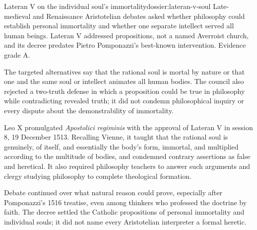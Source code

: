 \begin{heresydossier}{Lateran V on the individual soul's immortality}{dossier:lateran-v-soul}
\objectfield Late-medieval and Renaissance Aristotelian debates asked whether philosophy could establish personal immortality and whether one separate intellect served all human beings. Lateran V addressed propositions, not a named Averroist church, and its decree predates Pietro Pomponazzi's best-known intervention. Evidence grade A.

\propositionfield The targeted alternatives say that the rational soul is mortal by nature or that one and the same soul or intellect animates all human bodies. The council also rejected a two-truth defense in which a proposition could be true in philosophy while contradicting revealed truth; it did not condemn philosophical inquiry or every dispute about the demonstrability of immortality.

\responsefield Leo X promulgated \emph{Apostolici regiminis} with the approval of Lateran V in session 8, 19 December 1513. Recalling Vienne, it taught that the rational soul is genuinely, of itself, and essentially the body's form, immortal, and multiplied according to the multitude of bodies, and condemned contrary assertions as false and heretical. It also required philosophy teachers to answer such arguments and clergy studying philosophy to complete theological formation.

\aftermathfield Debate continued over what natural reason could prove, especially after Pomponazzi's 1516 treatise, even among thinkers who professed the doctrine by faith. The decree settled the Catholic propositions of personal immortality and individual souls; it did not name every Aristotelian interpreter a formal heretic.
\end{heresydossier}
